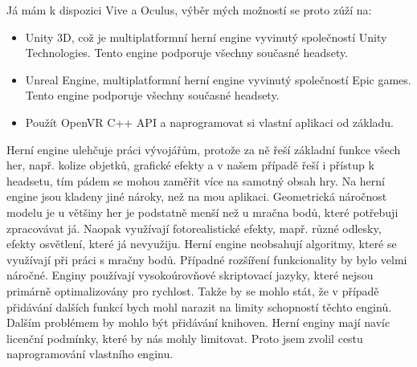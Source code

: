 Já mám k dispozici Vive a Oculus, výběr mých možností se proto zúží na:


\begin{itemize}
	\item Unity 3D, což je multiplatformní herní engine vyvinutý společností Unity Technologies. Tento engine podporuje všechny současné headsety. 
	
	\item Unreal Engine, multiplatformní herní engine vyvinutý společností Epic games. Tento engine podporuje všechny současné headsety.	
	
	\item Použít OpenVR C++ API a naprogramovat si vlastní aplikaci od základu.
\end{itemize}

Herní engine ulehčuje práci vývojářům, protože za ně řeší základní funkce všech her, např. kolize objetků, grafické efekty a v našem případě řeší i přístup k headsetu, tím pádem se mohou zaměřit více na samotný obsah hry. Na herní engine jsou kladeny jiné nároky, než na mou aplikaci. Geometrická náročnost modelu je u většiny her je podstatně menší než u mračna bodů, které potřebuji zpracovávat já. Naopak využívají fotorealistické efekty, mapř. různé odlesky, efekty osvětlení, které já nevyužiju.
Herní engine neobsahují algoritmy, které se využívají při práci s mračny bodů. Případné rozšíření funkcionality by bylo velmi náročné. Enginy používají vysokoúrovňové skriptovací jazyky, které nejsou primárně optimalizovány pro rychlost. Takže by se mohlo stát, že v případě přidávání dalších funkcí bych mohl narazit na limity schopností těchto enginů.
Dalším problémem by mohlo být přidávání knihoven. 
Herní enginy mají navíc licenční podmínky, které by nás mohly limitovat. Proto jsem zvolil cestu naprogramování vlastního enginu.